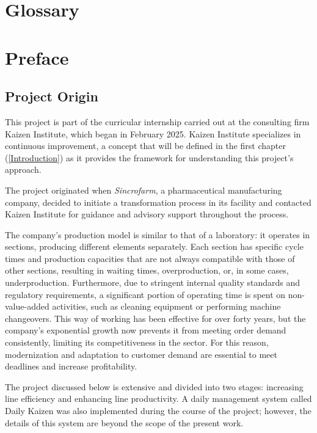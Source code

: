 \documentclass[]{article}
\begin{document}
\tableofcontents
\clearpage
\listoffigures %
\clearpage
\listoftables           %
\clearpage
\section*{Glossary}\label{glossary}
\printglossaries
\newpage


\newpage
\section*{Preface}
\subsection*{Project Origin}

This project is part of the curricular internship carried out at the consulting firm Kaizen Institute, which began in February 2025. Kaizen Institute specializes in continuous improvement, a concept that will be defined in the first chapter (\ref{Introduction}) as it provides the framework for understanding this project’s approach.

The project originated when \textit{Sincrofarm}, a pharmaceutical manufacturing company, decided to initiate a transformation process in its facility and contacted Kaizen Institute for guidance and advisory support throughout the process.

The company’s production model is similar to that of a laboratory: it operates in sections, producing different elements separately. Each section has specific cycle times and production capacities that are not always compatible with those of other sections, resulting in waiting times, overproduction, or, in some cases, underproduction. Furthermore, due to stringent internal quality standards and regulatory requirements, a significant portion of operating time is spent on non-value-added activities, such as cleaning equipment or performing machine changeovers. This way of working has been effective for over forty years, but the company’s exponential growth now prevents it from meeting order demand consistently, limiting its competitiveness in the sector. For this reason, modernization and adaptation to customer demand are essential to meet deadlines and increase profitability.

The project discussed below is extensive and divided into two stages: increasing line efficiency and enhancing line productivity. A daily management system called Daily Kaizen was also implemented during the course of the project; however, the details of this system are beyond the scope of the present work.
\end{document}
